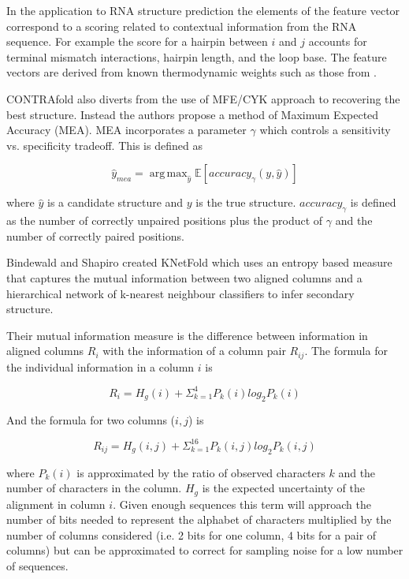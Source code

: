 \documentclass[journal]{IEEEtran}
\DeclareMathOperator*{\argmax}{arg\,max}
\begin{document}
In the application to RNA structure prediction the elements of the feature vector correspond to a scoring related to contextual information from the RNA sequence. For example the score for a hairpin between $i$ and $j$ accounts for terminal mismatch interactions, hairpin length, and the loop base. The feature vectors are derived from known thermodynamic weights such as those from \cite{mathews1999expanded}.

CONTRAfold also diverts from the use of MFE/CYK approach to recovering the best structure. Instead the authors propose a method of Maximum Expected Accuracy (MEA). MEA incorporates a parameter $\gamma$ which controls a sensitivity vs. specificity tradeoff. This is defined as

\begin{equation}
	\hat{y}_{mea} = \argmax_{\hat{y}} \mathbb{E}[accuracy_{\gamma}(y, \hat{y})]
\end{equation}

where $\hat{y}$ is a candidate structure and $y$ is the true structure. $accuracy_{\gamma}$ is defined as the number of correctly unpaired positions plus the product of $\gamma$ and the number of correctly paired positions. 

Bindewald and Shapiro \cite{bindewald2006rna} created KNetFold which uses an entropy based measure that captures the mutual information between two aligned columns and a hierarchical network of k-nearest neighbour classifiers to infer secondary structure. 

Their mutual information measure is the difference between information in aligned columns $R_i$ with the information of a column pair $R_{ij}$. The formula for the individual information in a column $i$ is 
	
\begin{equation}
	R_i = H_g(i) + \Sigma_{k=1}^4 P_k(i) log_2 P_k(i)
\end{equation}

And the formula for two columns ($i, j$) is

\begin{equation}
	R_{ij} = H_g(i, j) + \Sigma_{k=1}^{16} P_k(i, j) log_2 P_k(i, j)
\end{equation}

where $P_k(i)$ is approximated by the ratio of observed characters $k$ and the  number of characters in the column. $H_g$ is the expected uncertainty of the alignment in column $i$. Given enough sequences this term will approach the number of bits needed to represent the alphabet of characters multiplied by the number of columns considered (i.e. 2 bits for one column, 4 bits for a pair of columns) but can be approximated to correct for sampling noise for a low number of sequences.
\end{document}
